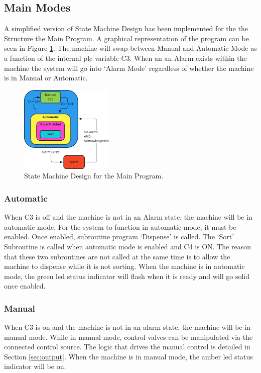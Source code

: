     \subsection{Main Modes}
    A simplified version of State Machine Design has been implemented for the the Structure the Main Program. A graphical representation of the program can be seen in Figure \ref{fig:mainStateMachine}. The machine will swap between Manual and Automatic Mode as a function of the internal \acrshort{plc} variable C3. When an an Alarm exists within the machine the system will go into `Alarm Mode' regardless of whether the machine is in Manual or Automatic. 
        \begin{figure}[H]
            \centering
            \includegraphics[width = 0.4\textwidth]{2_images/mainStateMachine}
            \caption{State Machine Design for the Main Program.}
            \label{fig:mainStateMachine}
        \end{figure}
    
        \subsubsection{Automatic}
            When C3 is off and the machine is not in an Alarm state, the machine will be in automatic mode. For the system to function in automatic mode, it must be enabled.  Once enabled, subroutine program `Dispense' is called. The `Sort' Subroutine is called when automatic mode is enabled and C4 is ON. The reason that these two subroutines are not called at the same time is to allow the machine to dispense while it is not sorting. 
            When the machine is in automatic mode, the green \acrshort{led} status indicator will flash when it is ready and will go solid once enabled.

        \subsubsection{Manual}
            When C3 is on and the machine is not in an alarm state, the machine will be in manual mode. While in manual mode, control valves can be manipulated via the connected control source. The logic that drives the manual control is detailed in Section \ref{sec:output}.
            When the machine is in manual mode, the amber \acrshort{led} status indicator will be on. 

